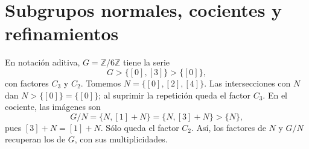 \section{Subgrupos normales, cocientes y refinamientos}
\begin{ejem}
En notación aditiva, $G=\mathbb Z/6\mathbb Z$ tiene la serie
\[
G>\{[0],[3]\}>\{[0]\},
\]
con factores $C_3$ y $C_2$. Tomemos $N=\{[0],[2],[4]\}$. Las intersecciones con $N$ dan $N>\{[0]\}=\{[0]\}$; al suprimir la repetición queda el factor $C_3$. En el cociente, las imágenes son
\[
G/N=\{N,[1]+N\}=\{N,[3]+N\}>\{N\},
\]
pues $[3]+N=[1]+N$. Sólo queda el factor $C_2$. Así, los factores de $N$ y $G/N$ recuperan los de $G$, con sus multiplicidades.
\end{ejem}

